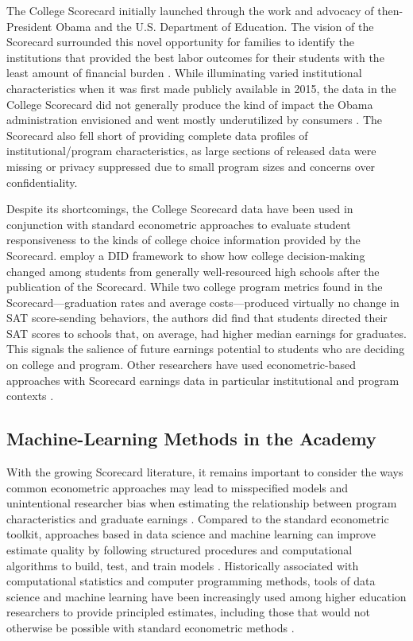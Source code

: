 \documentclass[a4paper, 12pt]{article}
\begin{document}
The College Scorecard initially launched through the work and advocacy
of then-President Obama and the U.S. Department of Education. The
vision of the Scorecard surrounded this novel opportunity for families
to identify the institutions that provided the best labor outcomes for
their students with the least amount of financial burden
\parencite{obama_2013}. While illuminating varied institutional
characteristics when it was first made publicly available in 2015, the
data in the College Scorecard did not generally produce the kind of
impact the Obama administration envisioned and went mostly
underutilized by consumers \parencite{huntington2016search}. The
Scorecard also fell short of providing complete data profiles of
institutional/program characteristics, as large sections of released
data were missing or privacy suppressed due to small program sizes and
concerns over confidentiality.

Despite its shortcomings, the College Scorecard data have been used in
conjunction with standard econometric approaches to evaluate student
responsiveness to the kinds of college choice information provided by
the Scorecard. \textcite{hurwitz_student_2018} employ a DID framework
to show how college decision-making changed among students from
generally well-resourced high schools after the publication of the
Scorecard. While two college program metrics found in the
Scorecard---graduation rates and average costs---produced virtually no
change in SAT score-sending behaviors, the authors did find that
students directed their SAT scores to schools that, on average, had
higher median earnings for graduates. This signals the salience of
future earnings potential to students who are deciding on college and
program. Other researchers have used econometric-based approaches with
Scorecard earnings data in particular institutional and program
contexts \parencite{boland_effect_2021, elu_earnings_2019,
mabel_value_2020, seaman_assessing_2017}.

\subsection*{Machine-Learning Methods in the Academy}

With the growing Scorecard literature, it remains important to
consider the ways common econometric approaches may lead to
misspecified models and unintentional researcher bias when estimating
the relationship between program characteristics and graduate earnings
\parencite{Imbens_2004}. Compared to the standard econometric toolkit,
approaches based in data science and machine learning can improve
estimate quality by following structured procedures and computational
algorithms to build, test, and train models
\parencite{Hastie_etal_2016}. Historically associated with
computational statistics and computer programming methods, tools of
data science and machine learning have been increasingly used among
higher education researchers to provide principled estimates,
including those that would not otherwise be possible with standard
econometric methods \parencite{skinner2021civic, aulck2017predicting,
savvas_etal_2021, Zeineddine_2021}.
\end{document}
